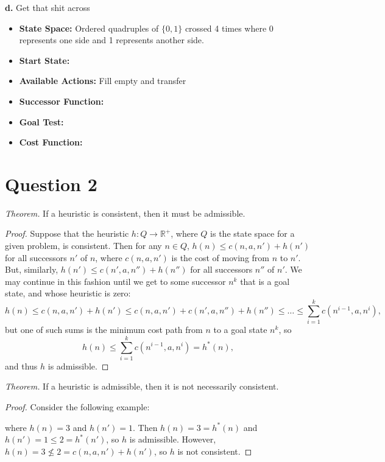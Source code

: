 \documentclass[11pt]{article}
\begin{document}
\textbf{d.} Get that shit across
\begin{itemize}
\item \textbf{State Space:} Ordered quadruples of $\{0,1\}$ crossed 4 times where 0 represents one side and 1 represents another side. 
\item \textbf{Start State:}
\item \textbf{Available Actions:} Fill empty and transfer
\item \textbf{Successor Function:}
\item \textbf{Goal Test:} 
\item \textbf{Cost Function:}

\end{itemize}

\section*{Question 2}

\emph{Theorem.}
If a heuristic is consistent, then it must be admissible.

\begin{proof}
Suppose that the heuristic $h: Q \rightarrow \mathbb{R}^+$, where $Q$ is the state space for a given
problem, is consistent.  Then for any $n \in Q$, $h(n) \leq c(n, a, n') + h(n')$ for all successors
$n'$ of $n$, where $c(n, a, n')$ is the cost of moving from $n$ to $n'$.  But, similarly, $h(n') \leq
c(n', a, n'') + h(n'')$ for all successors $n''$ of $n'$.  We may continue in this fashion until we
get to some successor $n^k$ that is a goal state, and whose heuristic is zero:
\[
h(n) \leq c(n, a, n') + h(n') \leq c(n, a, n') + c(n', a, n'') + h(n'') \leq \dots \leq
\sum_{i = 1}^k c(n^{i-1}, a, n^i),
\]
but one of such sums is the minimum cost path from $n$ to a goal state $n^k$, so
\[
h(n) \leq \sum_{i = 1}^k c(n^{i-1}, a, n^i) = h^*(n),
\]
and thus $h$ is admissible.
\end{proof}

\emph{Theorem.}
If a heuristic is admissible, then it is not necessarily consistent.

\begin{proof}
Consider the following example:

\vspace*{1in}

where $h(n) = 3$ and $h(n') = 1$.  Then $h(n) = 3 = h^*(n)$ and $h(n') = 1 \leq 2 = h^*(n')$,
so $h$ is admissible.  However, $h(n) = 3 \nleq 2 = c(n, a, n') + h(n')$, so $h$ is not consistent.
\end{proof}
\end{document}
